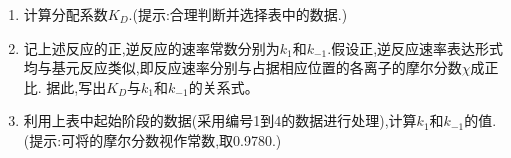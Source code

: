 \documentclass{ctexart}
\begin{document}
\begin{problem}
\begin{table}[H]
\begin{tabular}{|c|c|c|c|c|c|}
        \end{tabular}
    \end{table}\vspace{-15pt}
    \begin{enumerate}[label=\tbf{\arabic{Pcounter}-\arabic*},topsep=0pt,parsep=0pt,itemsep=0pt,partopsep=0pt]
        \item 计算分配系数$K_D$.(提示:合理判断并选择表中的数据.)
        \item 记上述反应的正,逆反应的速率常数分别为$k_1$和$k_{-1}$.假设正,逆反应速率表达形式均与基元反应类似,即反应速率分别与占据相应位置的各离子的摩尔分数$\chi$成正比.%
            据此,写出$K_D$与$k_1$和$k_{-1}$的关系式。
        \item 利用上表中起始阶段的数据(采用编号1到4的数据进行处理),计算$k_1$和$k_{-1}$的值.%
            (提示:可将的摩尔分数视作常数,取0.9780.)
    \end{enumerate}
\end{problem}
\end{document}
